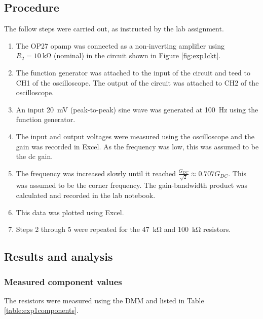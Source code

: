 \documentclass{report}
\begin{document}
\subsection{Procedure}
The follow steps were carried out, as instructed by the lab assignment.
\begin{enumerate}
	\item The OP27 opamp was connected as a non-inverting amplifier using $R_2=\SI{10}{\kohm}$ (nominal) in the circuit shown in Figure \ref{fig:exp1ckt}.
	\item The function generator was attached to the input of the circuit and teed to CH1 of the oscilloscope. The output of the circuit was attached to CH2 of the oscilloscope.
	\item An input \SI{20}{\mV} (peak-to-peak) sine wave was generated at \SI{100}{\Hz} using the function generator.
	\item The input and output voltages were measured using the oscilloscope and the gain was recorded in Excel. As the frequency was low, this was assumed to be the dc gain.
	\item The frequency was increased slowly until it reached $\frac{G_{DC}}{\sqrt{2}} \approx 0.707 G_{DC}$. This was assumed to be the corner frequency. The gain-bandwidth product was calculated and recorded in the lab notebook.
	\item This data was plotted using Excel.
	\item Steps 2 through 5 were repeated for the \SI{47}{\kohm} and \SI{100}{\kohm} resistors.
\end{enumerate}

\subsection{Results and analysis}

\subsubsection{Measured component values}
The resistors were measured using the DMM and listed in Table \ref{table:exp1components}.
\end{document}
